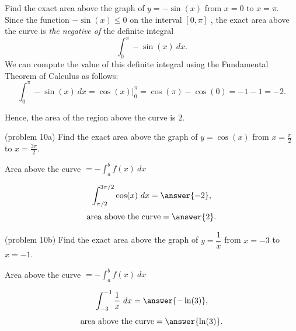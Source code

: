 \documentclass[handout]{ximera}
\begin{document}
\begin{example}[example 10]
Find the exact area above the graph of $y = -\sin(x)$ from $x = 0$ to $x = \pi$. \\
Since the function $-\sin(x) \leq 0$ on the interval $[0, \pi]$ , the exact area above the curve 
is \textit{the negative of} the definite integral 
\[\int_{0}^\pi -\sin(x) \ dx.\]
We can compute the value of this definite integral using the Fundamental Theorem of Calculus as follows:
\[\int_0^\pi -\sin(x) \ dx = \cos(x) \Big|_{0}^\pi = \cos(\pi) - \cos(0) = -1 -1 = -2.\]

Hence, the area of the region above the curve is $2$.


\begin{image}
\end{image}
\end{example}



\begin{problem}(problem 10a)
Find the exact area above the graph of $y = \cos(x)$ from $x = \frac{\pi}{2}$ to $x = \frac{3\pi}{2}$. \\
\begin{hint}
Area above the curve $= -\int_a^b f(x) \ dx$
\end{hint}
\[\int_{\pi/2}^{3\pi/2} \cos(x) \ dx = \answer{-2},\]
\[\text{area above the curve} = \answer{2}.\]
\end{problem}


\begin{problem}(problem 10b)
Find the exact area above the graph of $y = \dfrac{1}{x}$ from $x = -3$ to $x = -1$. \\
\begin{hint}
Area above the curve $= -\int_a^b f(x) \ dx$
\end{hint}
\[\int_{-3}^{-1} \frac{1}{x} \ dx = \answer{-\ln(3)},\]
\[\text{area above the curve} = \answer{\ln(3)}.\]
\end{problem}
\end{document}
